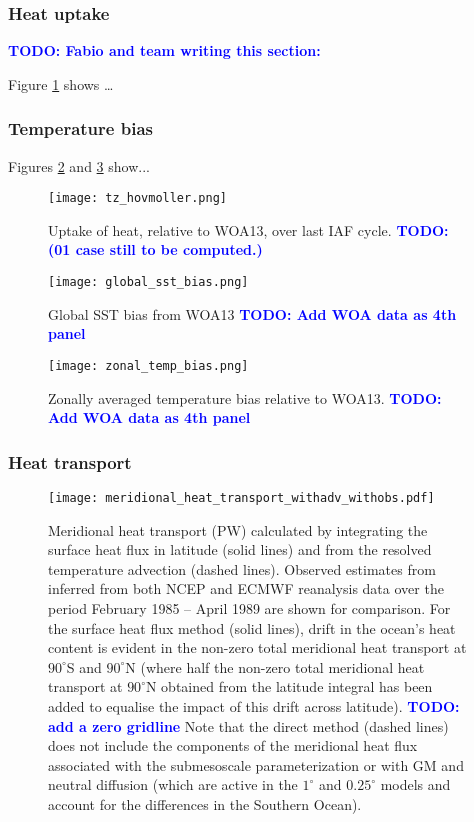 \documentclass[gmd, manuscript]{copernicus}
\newcommand{\TODO}[1]{\textcolor{blue}{\textsf{\textbf{TODO: #1}}}}
\begin{document}
\subsubsection{Heat uptake}
\TODO{Fabio and team writing this section:} 

Figure \ref{fig:hovmoller} shows \ldots

\subsubsection{Temperature bias}
Figures \ref{fig:sstbias} and \ref{fig:zonaltemp} show...

\begin{figure}[t]
\texttt{[image: tz\_hovmoller.png]}
\caption{Uptake of heat, relative to WOA13, over last IAF cycle. \TODO{(01 case still to be computed.)} \label{fig:hovmoller}}
\end{figure}

\begin{figure}[t]
\texttt{[image: global\_sst\_bias.png]}
\caption{Global SST bias from WOA13 \TODO{Add WOA data as 4th panel}\label{fig:sstbias}}
\end{figure}

\begin{figure}[t]
 \texttt{[image: zonal\_temp\_bias.png]}
 \caption{Zonally averaged temperature bias relative to WOA13. \TODO{Add WOA data as 4th panel} \label{fig:zonaltemp}}
\end{figure}

\subsubsection{Heat transport} 

\begin{figure}[t]
\texttt{[image: meridional\_heat\_transport\_withadv\_withobs.pdf]}
\caption{Meridional heat transport (PW) calculated by integrating the surface heat flux in latitude (solid lines) and from the resolved temperature advection (dashed lines).
  Observed estimates from \citet{Trenberth2001} inferred from both NCEP and ECMWF reanalysis data over the period February 1985 -- April 1989 are shown for comparison.
  For the surface heat flux method (solid lines), drift in the ocean's heat content is evident in the non-zero total meridional heat transport at $90^\circ$S and $90^\circ$N (where half the non-zero total meridional heat transport at $90^\circ$N obtained from the latitude integral has been added to equalise the impact of this drift across latitude).
  \TODO{add a zero gridline}
  Note that the direct method (dashed lines) does not include the components of the meridional heat flux associated with the submesoscale parameterization or with GM and neutral diffusion (which are active in the $1^\circ$ and $0.25^\circ$ models and account for the differences in the Southern Ocean).
  \label{fig:MHT}}
\end{figure}
\end{document}
